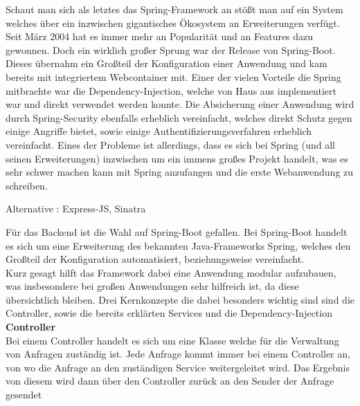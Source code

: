 Schaut man sich als letztes das Spring-Framework an stößt man auf ein System welches über ein inzwischen gigantisches Ökosystem an Erweiterungen verfügt. Seit März 2004 hat es immer mehr an Popularität und an Features dazu gewonnen. Doch ein wirklich großer Sprung war der Release von Spring-Boot. Dieses übernahm ein Großteil der Konfiguration einer Anwendung und kam bereits mit integriertem Webcontainer mit. Einer der vielen Vorteile die Spring mitbrachte war die Dependency-Injection, welche von Haus aus implementiert war und direkt verwendet werden konnte. Die Absicherung einer Anwendung wird durch Spring-Security ebenfalls erheblich vereinfacht, welches direkt Schutz gegen einige Angriffe bietet, sowie einige Authentifizierungsverfahren erheblich vereinfacht. Eines der Probleme ist allerdings, dass es sich bei Spring (und all seinen Erweiterungen) inzwischen um ein immens großes Projekt handelt, was es sehr schwer machen kann mit Spring anzufangen und die erste Webanwendung zu schreiben.


Alternative : Express-JS, Sinatra

Für das Backend ist die Wahl auf Spring-Boot gefallen. Bei Spring-Boot handelt es sich um eine Erweiterung des bekannten Java-Frameworks Spring, welches den Großteil der Konfiguration automatisiert, beziehungsweise vereinfacht. \\



Kurz gesagt hilft das Framework dabei eine Anwendung modular aufzubauen, was insbesondere bei großen Anwendungen sehr hilfreich ist, da diese übersichtlich bleiben. Drei Kernkonzepte die dabei besonders wichtig sind sind die Controller, sowie die bereits erklärten Services und die Dependency-Injection \\

\textbf{Controller}\\
Bei einem Controller handelt es sich um eine Klasse welche für die Verwaltung von Anfragen zuständig ist. Jede Anfrage kommt immer bei einem Controller an, von wo die Anfrage an den zuständigen Service weitergeleitet wird. Das Ergebnis von diesem wird dann über den Controller zurück an den Sender der Anfrage gesendet \\

